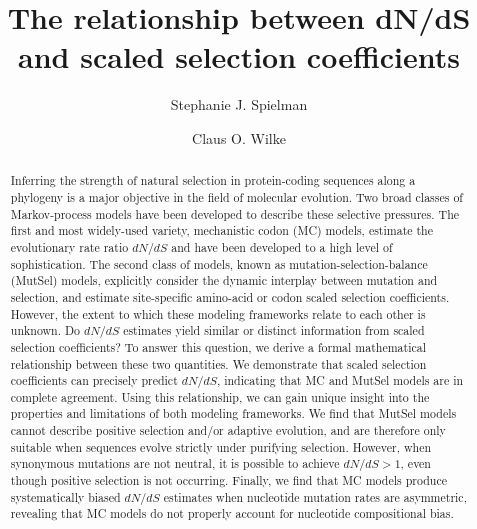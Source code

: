 \documentclass{pnastwo}
\begin{document}
	
	
\title{The relationship between dN/dS and scaled selection coefficients}

\author{Stephanie J. Spielman 
	\and
	Claus O. Wilke}


\maketitle
\begin{article}
	
\begin{abstract} %
Inferring the strength of natural selection in protein-coding sequences along a phylogeny is a major objective in the field of molecular evolution. Two broad classes of Markov-process models have been developed to describe these selective pressures. The first and most widely-used variety, mechanistic codon (MC) models, estimate the evolutionary rate ratio $dN/dS$ and have been developed to a high level of sophistication. The second class of models, known as mutation-selection-balance (MutSel) models, explicitly consider the dynamic interplay between mutation and selection, and estimate site-specific amino-acid or codon scaled selection coefficients. However, the extent to which these modeling frameworks relate to each other is unknown. Do $dN/dS$ estimates yield similar or distinct information from scaled selection coefficients? To answer this question, we derive a formal mathematical relationship between these two quantities. We demonstrate that scaled selection coefficients can precisely predict $dN/dS$, indicating that MC and MutSel models are in complete agreement. Using this relationship, we can gain unique insight into the properties and limitations of both modeling frameworks. We find that MutSel models cannot describe positive selection and/or adaptive evolution, and are therefore only suitable when sequences evolve strictly under purifying selection. However, when synonymous mutations are not neutral, it is possible to achieve $dN/dS > 1$, even though positive selection is not occurring. Finally, we find that MC models produce systematically biased $dN/dS$ estimates when nucleotide mutation rates are asymmetric, revealing that MC models do not properly account for nucleotide compositional bias.
\end{abstract}


\end{article}
\end{document}
